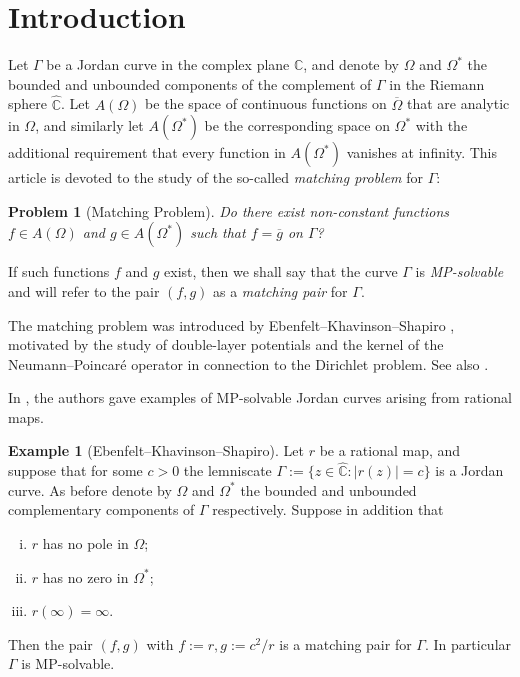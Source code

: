 \documentclass{amsart}
\theoremstyle{plain}
\newtheorem{problem}[theorem]{Problem}
\theoremstyle{definition}
\newtheorem{example}{Example}[section]
\theoremstyle{remark}
\newcommand{\mC}{\mathbb{C}}
\newcommand{\hC}{\widehat{\mathbb{C}}}
\begin{document}
\section{Introduction}
\label{sec1}

Let $\Gamma$ be a Jordan curve in the complex plane $\mC$, and denote by $\Omega$ and $\Omega^*$ the bounded and unbounded components of the complement of $\Gamma$ in the Riemann sphere $\hC$. Let $A(\Omega)$ be the space of continuous functions on $\overline{\Omega}$ that are analytic in $\Omega$, and similarly let $A(\Omega^*)$ be the corresponding space on $\Omega^*$ with the additional requirement that every function in $A(\Omega^*)$ vanishes at infinity. This article is devoted to the study of the so-called \textit{matching problem} for $\Gamma$:

\begin{problem}[Matching Problem]
Do there exist non-constant functions $f \in A(\Omega)$ and $g \in A(\Omega^*)$ such that $f=\overline{g}$ on $\Gamma$?
\end{problem}
If such functions $f$ and $g$ exist, then we shall say that the curve $\Gamma$ is \textit{MP-solvable} and will refer to the pair $(f,g)$ as a \textit{matching pair} for $\Gamma$.

The matching problem was introduced by Ebenfelt--Khavinson--Shapiro \cite{EbenfeltKhavinsonShapiro2001}, motivated by the study of double-layer potentials and the kernel of the Neumann--Poincar\'e operator in connection to the Dirichlet problem. See also \cite[Section 3]{Khavinson2018}.

In \cite{EbenfeltKhavinsonShapiro2001}, the authors gave examples of MP-solvable Jordan curves arising from rational maps.

\begin{example}[Ebenfelt--Khavinson--Shapiro]
\label{lemniscate}
Let $r$ be a rational map, and suppose that for some $c>0$ the lemniscate $\Gamma:=\{z \in \hC:|r(z)|=c\}$ is a Jordan curve. As before denote by $\Omega$ and $\Omega^*$ the bounded and unbounded complementary components of $\Gamma$ respectively. Suppose in addition that
\begin{enumerate}[(i)]
\item $r$ has no pole in $\Omega$;
\item $r$ has no zero in $\Omega^*$;
\item $r(\infty)=\infty.$
\end{enumerate}
Then the pair $(f,g)$ with $f:=r, g:=c^2/r$ is a matching pair for $\Gamma$. In particular $\Gamma$ is MP-solvable.
\end{example}
\end{document}
